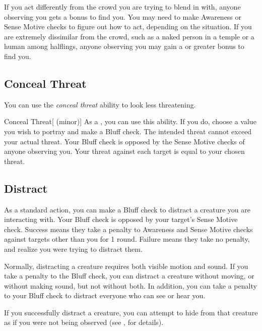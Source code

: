         If you act differently from the crowd you are trying to blend in with, anyone observing you gets a  bonus to find you. You may need to make Awareness or Sense Motive checks to figure out how to act, depending on the situation. If you are extremely dissimilar from the crowd, such as a naked person in a temple or a human among halflings, anyone observing you may gain a  or greater bonus to find you.

    \subsection{Conceal Threat}\label{Conceal Threat}
        You can use the \textit{conceal threat} ability to look less threatening.
        \begin{ability}{Conceal Threat}[ (minor)]
            As a , you can use this ability.
            If you do, choose a  value you wish to portray and make a Bluff check.
            The intended threat cannot exceed your actual threat.
            Your Bluff check is opposed by the Sense Motive checks of anyone observing you.
            \hit Your threat against each target is equal to your chosen threat.
        \end{ability}

    \subsection{Distract}\label{Distract}
        As a standard action, you can make a Bluff check to distract a creature you are interacting with.
        Your Bluff check is opposed by your target's Sense Motive check.
        Success means they take a  penalty to Awareness and Sense Motive checks against targets other than you for 1 round.
        Failure means they take no penalty, and realize you were trying to distract them.

        Normally, distracting a creature requires both visible motion and sound.
        If you take a  penalty to the Bluff check, you can distract a creature without moving, or without making sound, but not without both.
        In addition, you can take a  penalty to your Bluff check to distract everyone who can see or hear you.

        If you successfully distract a creature, you can attempt to hide from that creature as if you were not being observed (see , for details).

